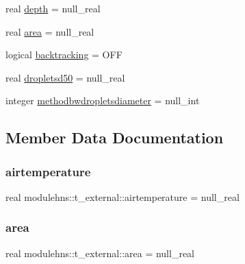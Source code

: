 \begin{DoxyCompactItemize}
real \mbox{\hyperlink{structmodulehns_1_1t__external_ac4fa57f6c39894bc0aaddfb2f10e3acc}{depth}} = null\+\_\+real
\item 
real \mbox{\hyperlink{structmodulehns_1_1t__external_a9eb2e7d29b17b7b46fb44ed359fc825c}{area}} = null\+\_\+real
\item 
logical \mbox{\hyperlink{structmodulehns_1_1t__external_ab7763815b63cf2e8e30764f891ffa31c}{backtracking}} = O\+FF
\item 
real \mbox{\hyperlink{structmodulehns_1_1t__external_a2cd500cbb1aaf8687946e8dd10d1ba9d}{dropletsd50}} = null\+\_\+real
\item 
integer \mbox{\hyperlink{structmodulehns_1_1t__external_afe48d8e063cde3c64da6ebfabbaa483f}{methodbwdropletsdiameter}} = null\+\_\+int
\end{DoxyCompactItemize}


\subsection{Member Data Documentation}
\mbox{\label{structmodulehns_1_1t__external_ae4f4220aca7e87582a515af8cb172aae}} 
\subsubsection{\texorpdfstring{airtemperature}{airtemperature}}
{\footnotesize\ttfamily real modulehns\+::t\+\_\+external\+::airtemperature = null\+\_\+real\hspace{0.3cm}{\ttfamily [private]}}

\mbox{\label{structmodulehns_1_1t__external_a9eb2e7d29b17b7b46fb44ed359fc825c}} 
\subsubsection{\texorpdfstring{area}{area}}
{\footnotesize\ttfamily real modulehns\+::t\+\_\+external\+::area = null\+\_\+real\hspace{0.3cm}{\ttfamily [private]}}

